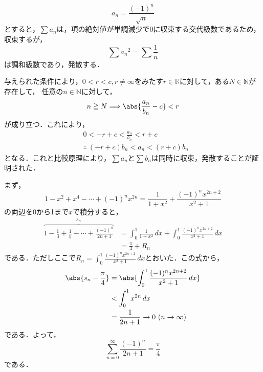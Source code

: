 
\begin{tanswer}
\[
a_n = \frac{(-1)^n}{\sqrt{n}}
\]
とすると，$\sum a_n$は，項の絶対値が単調減少で$0$に収束する交代級数であるため，収束するが，
\[
\sum {a_n}^2 = \sum \frac{1}{n}
\]
は調和級数であり，発散する．
\end{tanswer}


\begin{tproof}
    与えられた条件により，$0 <r <c , r \ne \infty $をみたす$r \in \mathbb{R}$に対して，ある$N \in \mathbb{N}$が存在して，
    任意の$n \in \mathbb{N}$に対して，
    \[
        n \ge N \Longrightarrow \abs{\frac{a_n}{b_n}-c}<r
    \]
    が成り立つ．これにより，
    \begin{align*}
         & 0<-r +c < \frac{a_n}{b_n} < r+c            \\
         & \therefore ~  (-r+c) b_n < a_n < (r+c) b_n
    \end{align*}
    となる．これと比較原理により，$\sum a_n$と$\sum b_n$は同時に収束，発散することが証明された．
\end{tproof}

\begin{tanswer}
    まず，
    \[
        1-x^2+x^4-\cdots+(-1)^n x^{2n} =\frac{1}{1+x^2} +\frac{(-1)^n x^{2n+2}}{x^2+1}
    \]
    の両辺を0から1まで$x$で積分すると，
    \begin{align*}
        \overbrace{1-\frac{1}{3}+\frac{1}{5}-\cdots+\frac{(-1)^n}{2n+1}}^{s_n} & =\int_{0}^{1} \frac{1}{1+x^2} \, dx +\int_{0}^{1}\frac{(-1)^n x^{2n+2}}{x^2+1}  \, dx \\
                                                                               & = \frac{\pi}{4} + R_n
    \end{align*}
    である．ただしここで$R_n =\int_{0}^{1}\frac{(-1)^n x^{2n+2}}{x^2+1} \, dx$とおいた．この式から，
    \begin{align*}
        \abs{s_n -\frac{\pi}{4}  } & = \abs{\int_{0}^{1}\frac{(-1)^n x^{2n+2}}{x^2+1} \, dx } \\
                                   & < \int_{0}^{1} x^{2n} \, dx                              \\
                                   & =\frac{1}{2n+1} \to 0 ~(n \to \infty)
    \end{align*}
    である．よって，
    \[
        \sum_{n=0}^{\infty} \frac{(-1)^n}{2n+1} =\frac{\pi}{4}
    \]
    である．
\end{tanswer}



